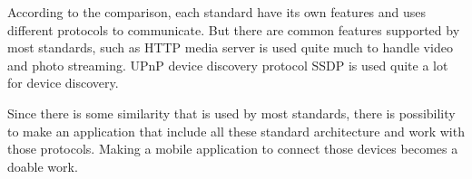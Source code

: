 \begin{enumerate}
\end{enumerate} 

According to the comparison, each standard have its own features and uses
different protocols to communicate. But there are common features supported by
most standards, such as HTTP media server is used quite much to handle video
and photo streaming. UPnP device discovery protocol SSDP is used quite a lot
for device discovery.

Since there is some similarity that is used by most standards, there is
possibility to make an application that include all these standard
architecture and work with those protocols.
Making a mobile application to connect those devices becomes a doable work.


